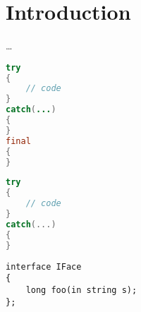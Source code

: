 \section{Introduction}
\label{section:Introduction}

\dots

\begin{lstlisting}[language=Java]
try
{
    // code
}
catch(...)
{
}
final
{
}
\end{lstlisting}

\begin{lstlisting}[language=C++]
try
{
    // code
}
catch(...)
{
}
\end{lstlisting}


\begin{lstlisting}[language=IDL]
interface IFace
{
	long foo(in string s);
};
\end{lstlisting}